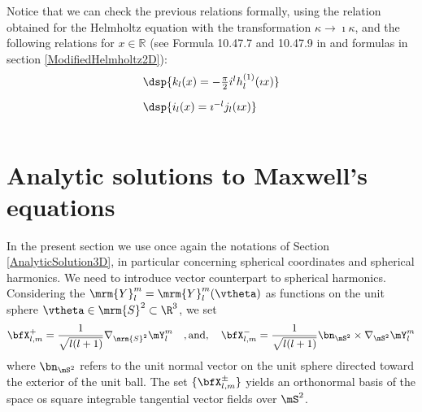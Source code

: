 \documentclass[a4paper,11pt]{article}
\begin{document}
Notice that we can check the previous relations formally, using the relation obtained for the Helmholtz equation with the transformation $\kappa \rightarrow \imath \kappa$, and the following relations for $x\in \mathbb{R}$ (see Formula 10.47.7 and 10.47.9 in
\cite{MR2723248} and formulas in section \ref{ModifiedHelmholtz2D}):
$$
\begin{array}{ll}
\dsp{ k_{l}(x)=-\frac{\pi}{2}i^{l} h^{(1)}_{l}(\imath x)}\\[10pt]
\dsp{i_{l}(x)=\imath^{-l}j_{l}(\imath x)  }\\[10pt]
\end{array}
$$

\section{Analytic solutions to Maxwell's equations}

In the present section we use once again the notations of Section \ref{AnalyticSolution3D}, in particular concerning
spherical coordinates and spherical harmonics.  We need to introduce vector counterpart to spherical harmonics.
Considering  the $\mrm{Y}_{l}^{m} = \mrm{Y}_{l}^{m}(\vtheta)$ as functions on the unit sphere $\vtheta\in \mrm{S}^{2}\subset \R^{3}$,
we set
$$
\bfX_{l,m}^{+} = \frac{1}{\sqrt{l(l+1)}}\nabla_{\mrm{S}^{2}}\mY_{l}^{m}\quad,\textrm{and},\quad
\bfX_{l,m}^{-} = \frac{1}{\sqrt{l(l+1)}}\bn_{\mS^{2}}\times\nabla_{\mS^{2}}\mY_{l}^{m}
$$
where $\bn_{\mS^{2}}$ refers to the unit normal vector on the unit sphere directed toward the exterior of the unit ball.
The set $\{\bfX_{l,m}^{\pm}\}$ yields an orthonormal basis of the space os square integrable
tangential vector fields over $\mS^{2}$.
\end{document}
